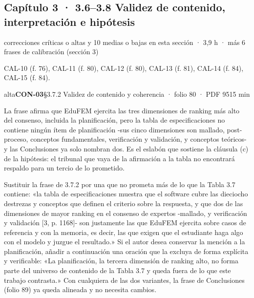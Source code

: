 \subsection{Capítulo 3 · 3.6–3.8 Validez de contenido, interpretación e hipótesis}
{\small\color{gris} correcciones críticas o altas y 10 medias o bajas en esta sección · 3,9 h · más 6 frases de calibración (sección 3)}\par
{\small{}CAL-10 (f. 76), CAL-11 (f. 80), CAL-12 (f. 80), CAL-13 (f. 81), CAL-14 (f. 84), CAL-15 (f. 84).\par}
\begin{ficha}{alta}{\casilla\textbf{CON-03}\quad{}\quad §3.7.2 Validez de contenido y coherencia · folio 80 · PDF 95\hfill 15 min}
\par
{}La frase afirma que EduFEM ejercita las tres dimensiones de ranking más alto del consenso, incluida la planificación, pero la tabla de especificaciones no contiene ningún ítem de planificación -sus cinco dimensiones son mallado, post-proceso, conceptos fundamentales, verificación y validación, y conceptos teóricos- y las Conclusiones ya solo nombran dos. Es el eslabón que sostiene la cláusula (c) de la hipótesis: el tribunal que vaya de la afirmación a la tabla no encontrará respaldo para un tercio de lo prometido.\par
{}Sustituir la frase de 3.7.2 por una que no prometa más de lo que la Tabla 3.7 contiene: «la tabla de especificaciones muestra que el software cubre las dieciocho destrezas y conceptos que definen el criterio sobre la respuesta, y que dos de las dimensiones de mayor ranking en el consenso de expertos -mallado, y verificación y validación [3, p. 1168]\allowbreak{}- son justamente las que EduFEM ejercita sobre casos de referencia y con la memoria, es decir, las que exigen que el estudiante haga algo con el modelo y juzgue el resultado.» Si el autor desea conservar la mención a la planificación, añadir a continuación una oración que la excluya de forma explícita y verificable: «La planificación, la tercera dimensión de ranking alto, no forma parte del universo de contenido de la Tabla 3.7 y queda fuera de lo que este trabajo contrasta.» Con cualquiera de las dos variantes, la frase de Conclusiones (folio 89) ya queda alineada y no necesita cambios.\par

\end{ficha}

